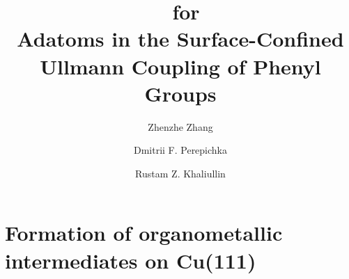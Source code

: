 \documentclass[journal=jpclcd,layout=traditional,manuscript=letter]{achemso} %
\title{\sinfo\ for \\
Adatoms in the Surface-Confined Ullmann Coupling of Phenyl Groups}%
\author{Zhenzhe Zhang}
\author{Dmitrii F. Perepichka}%
\author{Rustam Z. Khaliullin}
\affiliation{%
 Department of Chemistry, McGill University, 801 Sherbrooke St West, Montreal, QC H3A 0B8, Canada
}%
\begin{document}

\maketitle

%



\section{Formation of organometallic intermediates on Cu(111)} 

%
\end{document}
